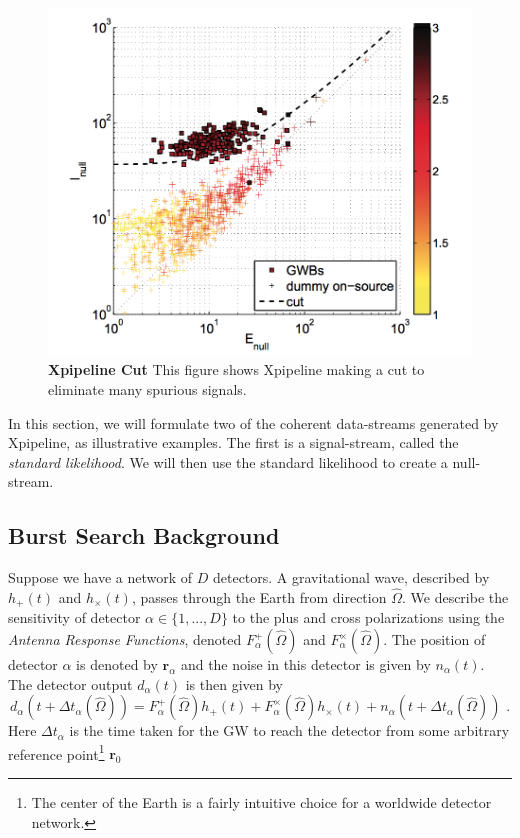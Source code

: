\documentclass[12pt,twoside,a4paper]{report}
\newcommand{\fs}{\text{ .}}
\newcommand{\Fp}{F^{+}_{\alpha}}
\newcommand{\Fx}{F^{\times}_{\alpha}}
\begin{document}
\begin{figure} %
\begin{center}
\includegraphics[width=0.8\linewidth]{xpipeline_cut.png}
\end{center}
\caption{\textbf{Xpipeline Cut} This figure shows Xpipeline making a cut to eliminate many spurious signals. } %
\label{fig:xcuts}
\end{figure}

In this section, we will formulate two of the coherent data-streams generated by Xpipeline, as illustrative examples. The first is a signal-stream, called the \textit{standard likelihood}. We will then use the standard likelihood to create a null-stream. 

\subsection{Burst Search Background}
Suppose we have a network of $D$ detectors. A gravitational wave, described by $h_+(t)$ and $h_\times (t)$, passes through the Earth from direction $\hat{\Omega}$. We describe the sensitivity of detector $\alpha \in \{1,...,D \}$ to the plus and cross polarizations using the \emph{Antenna Response Functions}, denoted $\Fp (\hat{\Omega})$ and $\Fx(\hat{\Omega})$. The position of detector $\alpha$ is denoted by $\textbf{r}_\alpha$ and the noise in this detector is given by $n_\alpha (t)$. The detector output $d_\alpha (t)$ is then given by
\begin{equation} \label{det_output}
d_\alpha (t + \Delta t_\alpha (\hat{\Omega})) = \Fp (\hat{\Omega}) h_+ (t) + \Fx (\hat{\Omega}) h_\times (t) + n_\alpha (t + \Delta t_\alpha (\hat{\Omega})) \fs
\end{equation}   
Here $\Delta t_\alpha$ is the time taken for the GW to reach the detector from some arbitrary reference point\footnote{The center of the Earth is a fairly intuitive choice for a worldwide detector network.} $\textbf{r}_0$
\end{document}
